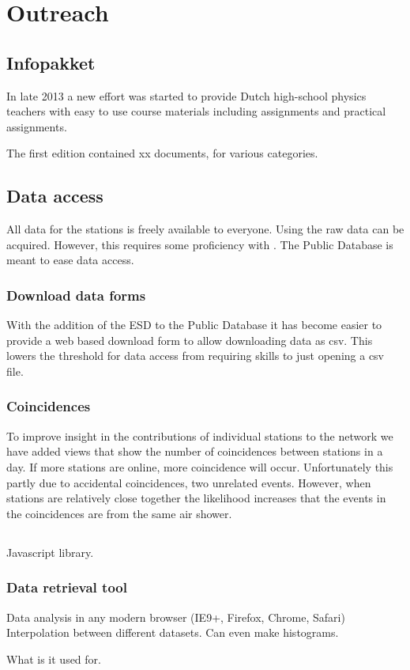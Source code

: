 \chapter{Outreach}
\label{ch:outreach}

\section{Infopakket}

In late 2013 a new effort was started to provide Dutch high-school
physics teachers with easy to use course materials including assignments
and practical assignments.

The first edition contained xx documents, for various categories.


\section{Data access}

All data for the \hisparc stations is freely available to everyone.
Using \sapphire the raw data can be acquired. However, this requires
some proficiency with \python. The Public Database is meant to ease data
access.


\subsection{Download data forms}

With the addition of the ESD to the Public Database it has become easier
to provide a web based download form to allow downloading data as csv.
This lowers the threshold for data access from requiring \python skills
to just opening a csv file.


\subsection{Coincidences}

To improve insight in the contributions of individual stations to the
\hisparc network we have added views that show the number of
coincidences between \hisparc stations in a day. If more stations are
online, more coincidence will occur. Unfortunately this partly due to
accidental coincidences, two unrelated events. However, when stations
are relatively close together the likelihood increases that the events
in the coincidences are from the same air shower.




\section{\jsparc}

Javascript library.


\subsection{Data retrieval tool}

Data analysis in any modern browser (IE9+, Firefox, Chrome, Safari)
Interpolation between different datasets. Can even make histograms.

What is it used for.
